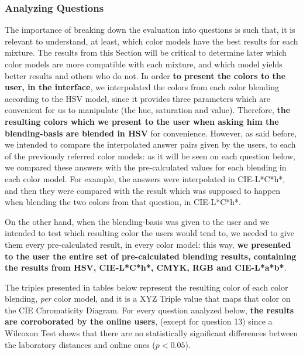 \subsubsection{Analyzing Questions}
\label{subsubsec:questions_analyzing}
%
The importance of breaking down the evaluation into questions is such that, it is relevant to understand, at least, which color models have the best
results for each mixture. The results from this Section will be critical to determine later which color models are more compatible with each mixture, and
which model yields better results and others who do not. In order \textbf{to present the colors to the user, in the interface}, we interpolated the colors from
each color blending according to the HSV model, since it provides three parameters which are convenient for us to manipulate (the hue, saturation and value).
Therefore, \textbf{the resulting colors which we present to the user when asking him the blending-basis are blended in HSV} for convenience. However, as
said before, we intended to compare the interpolated answer pairs given by the users, to each of the previously referred color models: as it will be seen
on each question below, we compared these answers with the pre-calculated values for each blending in each color model. For example, the answers were
interpolated in CIE-L*C*h*, and then they were compared with the result which was supposed to happen when blending the two colors from that question, in
CIE-L*C*h*. \par
%
On the other hand, when the blending-basis was given to the user and we intended to test which resulting color the users would tend to, we needed to give
them every pre-calculated result, in every color model: this way, \textbf{we presented to the user the entire set of pre-calculated blending results,
containing the results from HSV, CIE-L*C*h*, CMYK, RGB and CIE-L*a*b*}. \par
%
The triples presented in tables below represent the resulting color of each color blending, \emph{per} color model, and it is
a XYZ Triple value that maps that color on the CIE Chromaticity Diagram. For every question analyzed below, \textbf{the results are corroborated by the online users},
(except for question 13) since a Wilcoxon Test shows that there are no statistically significant differences between the laboratory distances and online ones ($p < 0.05$).
%
